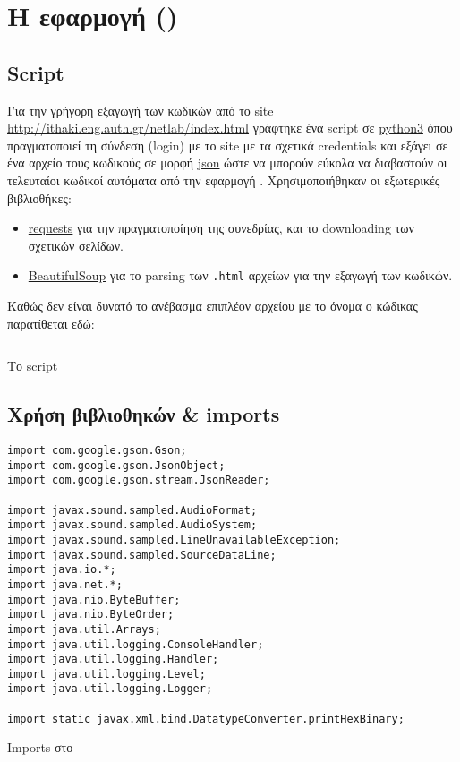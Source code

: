 \newcommand{\codeRef}[1]{\hyperref[section:#1]{\texttt!#1()!}}
\chapter{Η εφαρμογή (\appname{})}
\section{Script \scriptname{}}
Για την γρήγορη εξαγωγή των κωδικών από το site \url{http://ithaki.eng.auth.gr/netlab/index.html} γράφτηκε ένα script σε
\href{https://www.python.org/}{python3}
όπου πραγματοποιεί τη σύνδεση (login) με το site με τα σχετικά credentials και εξάγει σε ένα αρχείο τους κωδικούς σε μορφή
\href{https://en.wikipedia.org/wiki/JSON}{json} ώστε να μπορούν εύκολα να διαβαστούν οι τελευταίοι κωδικοί αυτόματα από την εφαρμογή \appname{}.
Χρησιμοποιήθηκαν οι εξωτερικές βιβλιοθήκες:
\begin{itemize}
\item \href{http://docs.python-requests.org/en/master/}{requests} για την πραγματοποίηση της συνεδρίας, και το downloading των σχετικών σελίδων.
\item \href{http://www.crummy.com/software/BeautifulSoup/}{BeautifulSoup} για το parsing των \texttt{.html} αρχείων για την εξαγωγή των κωδικών.
\end{itemize}

Καθώς δεν είναι δυνατό το ανέβασμα επιπλέον αρχείου με το όνομα \scriptname{} ο κώδικας παρατίθεται εδώ:
\begin{code}
\inputminted[frame=single, breaklines=true, linenos=true, python3=true]{python}{../extract-codes.py}
\caption{Το script \scriptname{}}
\label{listing:extract-codes}
\end{code}

\section{Χρήση βιβλιοθηκών \& imports}
\begin{code}
\begin{verbatim}
import com.google.gson.Gson;
import com.google.gson.JsonObject;
import com.google.gson.stream.JsonReader;

import javax.sound.sampled.AudioFormat;
import javax.sound.sampled.AudioSystem;
import javax.sound.sampled.LineUnavailableException;
import javax.sound.sampled.SourceDataLine;
import java.io.*;
import java.net.*;
import java.nio.ByteBuffer;
import java.nio.ByteOrder;
import java.util.Arrays;
import java.util.logging.ConsoleHandler;
import java.util.logging.Handler;
import java.util.logging.Level;
import java.util.logging.Logger;

import static javax.xml.bind.DatatypeConverter.printHexBinary;
\end{verbatim}
\caption{Imports στο \appname}
\end{code}

